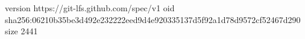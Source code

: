 version https://git-lfs.github.com/spec/v1
oid sha256:06210b35be3d492e232222eed9d4e920335137d5f92a1d78d9572cf52467d290
size 2441
